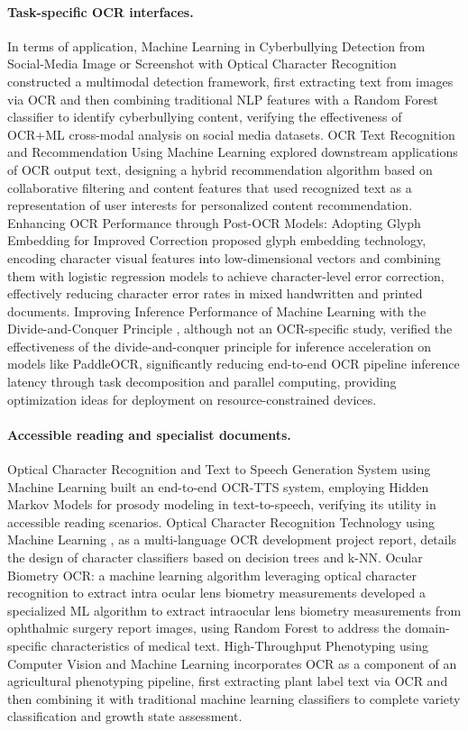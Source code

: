 \paragraph{Task-specific OCR interfaces.}
In terms of application, Machine Learning in Cyberbullying Detection from Social-Media Image or Screenshot with Optical Character Recognition \cite{chakraborty2020cyberbullying} constructed a multimodal detection framework, first extracting text from images via OCR and then combining traditional NLP features with a Random Forest classifier to identify cyberbullying content, verifying the effectiveness of OCR+ML cross-modal analysis on social media datasets. OCR Text Recognition and Recommendation Using Machine Learning \cite{sharma2019recommendation} explored downstream applications of OCR output text, designing a hybrid recommendation algorithm based on collaborative filtering and content features that used recognized text as a representation of user interests for personalized content recommendation. Enhancing OCR Performance through Post-OCR Models: Adopting Glyph Embedding for Improved Correction \cite{thanapala2021glyph} proposed glyph embedding technology, encoding character visual features into low-dimensional vectors and combining them with logistic regression models to achieve character-level error correction, effectively reducing character error rates in mixed handwritten and printed documents. Improving Inference Performance of Machine Learning with the Divide-and-Conquer Principle \cite{fu2021divide}, although not an OCR-specific study, verified the effectiveness of the divide-and-conquer principle for inference acceleration on models like PaddleOCR, significantly reducing end-to-end OCR pipeline inference latency through task decomposition and parallel computing, providing optimization ideas for deployment on resource-constrained devices.

\paragraph{Accessible reading and specialist documents.}
Optical Character Recognition and Text to Speech Generation System using Machine Learning \cite{patel2018tts} built an end-to-end OCR-TTS system, employing Hidden Markov Models for prosody modeling in text-to-speech, verifying its utility in accessible reading scenarios. Optical Character Recognition Technology using Machine Learning \cite{singh2017ocrtech}, as a multi-language OCR development project report, details the design of character classifiers based on decision trees and k-NN. Ocular Biometry OCR: a machine learning algorithm leveraging optical character recognition to extract intra ocular lens biometry measurements \cite{chen2022ocular} developed a specialized ML algorithm to extract intraocular lens biometry measurements from ophthalmic surgery report images, using Random Forest to address the domain-specific characteristics of medical text. High-Throughput Phenotyping using Computer Vision and Machine Learning \cite{singh2016phenotyping} incorporates OCR as a component of an agricultural phenotyping pipeline, first extracting plant label text via OCR and then combining it with traditional machine learning classifiers to complete variety classification and growth state assessment.

